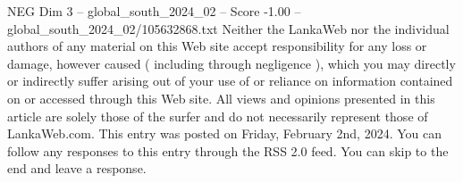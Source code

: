 \begin{textsample}{NEG Dim 3 – global\_south\_2024\_02 – Score -1.00 – global\_south\_2024\_02/105632868.txt}
Neither the LankaWeb nor the individual authors of any material on this Web site accept responsibility for any loss or damage, however caused ( including through negligence ), which you may directly or indirectly suffer arising out of your use of or reliance on information contained on or accessed through this Web site.
All views and opinions presented in this article are solely those of the surfer and do not necessarily represent those of LankaWeb.com.
This entry was posted on Friday, February 2nd, 2024.
You can follow any responses to this entry through the RSS 2.0 feed.
You can skip to the end and leave a response.

\end{textsample}

